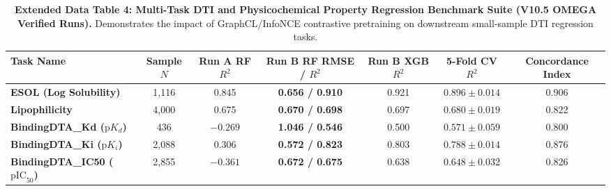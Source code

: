 \documentclass[11pt,a4paper]{article}
\begin{document}
\begin{table}[h!]
\caption{\textbf{Extended Data Table 4: Multi-Task DTI and Physicochemical Property Regression Benchmark Suite (V10.5 OMEGA Verified Runs).} Demonstrates the impact of GraphCL/InfoNCE contrastive pretraining on downstream small-sample DTI regression tasks.}
\label{tab:ed_regression}
\centering
\small
\begin{tabular}{lcccccc}
\toprule
\textbf{Task Name} & \textbf{Sample $N$} & \textbf{Run A RF $R^2$} & \textbf{Run B RF RMSE / $R^2$} & \textbf{Run B XGB $R^2$} & \textbf{5-Fold CV $R^2$} & \textbf{Concordance Index} \\
\midrule
\textbf{ESOL (Log Solubility)} & 1,116 & 0.845 & \textbf{0.656 / 0.910} & 0.921 & $0.896 \pm 0.014$ & 0.906 \\
\textbf{Lipophilicity} & 4,000 & 0.675 & \textbf{0.670 / 0.698} & 0.697 & $0.680 \pm 0.019$ & 0.822 \\
\textbf{BindingDTA\_Kd ($\text{p}K_d$)} & 436 & $-0.269$ & \textbf{1.046 / 0.546} & 0.500 & $0.571 \pm 0.059$ & 0.800 \\
\textbf{BindingDTA\_Ki ($\text{p}K_i$)} & 2,088 & 0.306 & \textbf{0.572 / 0.823} & 0.803 & $0.788 \pm 0.014$ & 0.876 \\
\textbf{BindingDTA\_IC50 ($\text{pIC}_{50}$)} & 2,855 & $-0.361$ & \textbf{0.672 / 0.675} & 0.638 & $0.648 \pm 0.032$ & 0.826 \\
\bottomrule
\end{tabular}
\end{table}

\vspace{1em}
\end{document}
